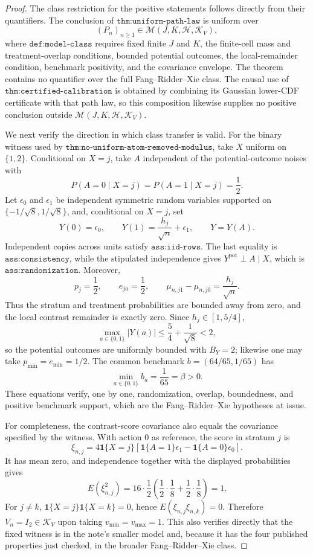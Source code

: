 \documentclass{article}
\begin{document}
\begin{proof}
The class restriction for the positive statements follows directly from their quantifiers.  The conclusion of \(\texttt{thm:uniform-path-law}\) is uniform over
\[
 (P_n)_{n\geq 1}\in\mathcal M(J,K,\mathcal H,\mathcal K_V),
\]
where \(\texttt{def:model-class}\) requires fixed finite \(J\) and \(K\), the finite-cell mass and treatment-overlap conditions, bounded potential outcomes, the local-remainder condition, benchmark positivity, and the covariance envelope.  The theorem contains no quantifier over the full Fang--Ridder--Xie class.  The causal use of \(\texttt{thm:certified-calibration}\) is obtained by combining its Gaussian lower-CDF certificate with that path law, so this composition likewise supplies no positive conclusion outside \(\mathcal M(J,K,\mathcal H,\mathcal K_V)\).

We next verify the direction in which class transfer is valid.  For the binary witness used by \(\texttt{thm:no-uniform-atom-removed-modulus}\), take \(X\) uniform on \(\{1,2\}\).  Conditional on \(X=j\), take \(A\) independent of the potential-outcome noises with
\[
 P(A=0\mid X=j)=P(A=1\mid X=j)=\frac12.
\]
Let \(\epsilon_0\) and \(\epsilon_1\) be independent symmetric random variables supported on \(\{-1/\sqrt8,1/\sqrt8\}\), and, conditional on \(X=j\), set
\[
 Y(0)=\epsilon_0,
 \qquad
 Y(1)=\frac{h_j}{\sqrt n}+\epsilon_1,
 \qquad
 Y=Y(A).
\]
Independent copies across units satisfy \(\texttt{ass:iid-rows}\).  The last equality is \(\texttt{ass:consistency}\), while the stipulated independence gives \(Y^{\mathrm{pot}}\perp A\mid X\), which is \(\texttt{ass:randomization}\).  Moreover,
\[
 p_j=\frac12,
 \qquad
 e_{ja}=\frac12,
 \qquad
 \mu_{n,j1}-\mu_{n,j0}=\frac{h_j}{\sqrt n}.
\]
Thus the stratum and treatment probabilities are bounded away from zero, and the local contrast remainder is exactly zero.  Since \(h_j\in[1,5/4]\),
\[
 \max_{a\in\{0,1\}}|Y(a)|
 \leq \frac54+\frac1{\sqrt8}<2,
\]
so the potential outcomes are uniformly bounded with \(B_Y=2\); likewise one may take \(p_{\min}=e_{\min}=1/2\).  The common benchmark \(b=(64/65,1/65)\) has
\[
 \min_{a\in\{0,1\}}b_a=\frac1{65}=\beta>0.
\]
These equations verify, one by one, randomization, overlap, boundedness, and positive benchmark support, which are the Fang--Ridder--Xie hypotheses at issue.

For completeness, the contrast-score covariance also equals the covariance specified by the witness.  With action \(0\) as reference, the score in stratum \(j\) is
\[
 \xi_{n,j}
 =4\mathbf 1\{X=j\}
 \left[\mathbf 1\{A=1\}\epsilon_1-
       \mathbf 1\{A=0\}\epsilon_0\right].
\]
It has mean zero, and independence together with the displayed probabilities gives
\[
 E(\xi_{n,j}^2)
 =16\cdot\frac12
 \left(\frac12\cdot\frac18+\frac12\cdot\frac18\right)=1.
\]
For \(j\neq k\), \(\mathbf 1\{X=j\}\mathbf 1\{X=k\}=0\), hence \(E(\xi_{n,j}\xi_{n,k})=0\).  Therefore \(V_n=I_2\in\mathcal K_V\) upon taking \(v_{\min}=v_{\max}=1\).  This also verifies directly that the fixed witness is in the note's smaller model and, because it has the four published properties just checked, in the broader Fang--Ridder--Xie class.


\end{proof}
\end{document}
